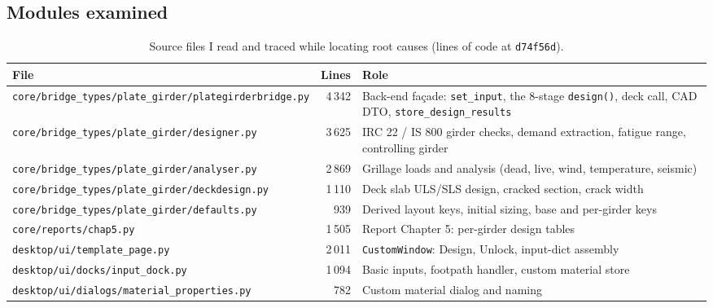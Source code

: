 \documentclass[11pt,a4paper]{article}
\newcommand{\src}[1]{\texttt{#1}}
\begin{document}
\subsection{Modules examined}
\begin{table}[htbp]
\caption{Source files I read and traced while locating root causes (lines of code at \texttt{d74f56d}).}\label{tab:srcfiles}
\footnotesize
\begin{tabularx}{\linewidth}{@{}lrY@{}}
\toprule
\textbf{File} & \textbf{Lines} & \textbf{Role} \\
\midrule
\src{core/bridge\_types/plate\_girder/plategirderbridge.py} & 4\,342 & Back-end façade: \texttt{set\_input}, the 8-stage \texttt{design()}, deck call, CAD DTO, \texttt{store\_design\_results} \\
\src{core/bridge\_types/plate\_girder/designer.py} & 3\,625 & IRC 22 / IS 800 girder checks, demand extraction, fatigue range, controlling girder \\
\src{core/bridge\_types/plate\_girder/analyser.py} & 2\,869 & Grillage loads and analysis (dead, live, wind, temperature, seismic) \\
\src{core/bridge\_types/plate\_girder/deckdesign.py} & 1\,110 & Deck slab ULS/SLS design, cracked section, crack width \\
\src{core/bridge\_types/plate\_girder/defaults.py} & 939 & Derived layout keys, initial sizing, base and per-girder keys \\
\src{core/reports/chap5.py} & 1\,505 & Report Chapter 5: per-girder design tables \\
\src{desktop/ui/template\_page.py} & 2\,011 & \texttt{CustomWindow}: Design, Unlock, input-dict assembly \\
\src{desktop/ui/docks/input\_dock.py} & 1\,094 & Basic inputs, footpath handler, custom material store \\
\src{desktop/ui/dialogs/material\_properties.py} & 782 & Custom material dialog and naming \\
\bottomrule
\end{tabularx}
\end{table}
\end{document}
